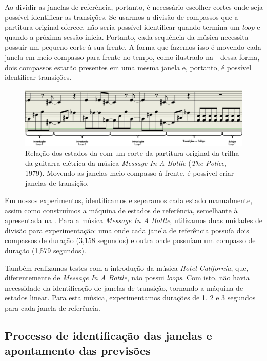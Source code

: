 Ao dividir as janelas de referência, portanto, é necessário escolher cortes onde seja possível identificar as transições. Se usarmos a divisão de compassos que a partitura original oferece, não seria possível identificar quando termina um \textit{loop} e quando a próxima sessão inicia. Portanto, cada sequência da música necessita possuir um pequeno corte à sua frente. A forma que fazemos isso é movendo cada janela em meio compasso para frente no tempo, como ilustrado na  - dessa forma, dois compassos estarão presentes em uma mesma janela e, portanto, é possível identificar transições.

\begin{figure}[htbp]
    \centering
    \includegraphics[width=1\textwidth]{images/dtw-window division.png}
    \caption{Relação dos estados da  com um corte da partitura original da trilha da guitarra elétrica da música \textit{Message In A Bottle} (\textit{The Police}, 1979). Movendo as janelas meio compasso à frente, é possível criar janelas de transição.}
    \label{fig:miab_windowed_sheet_music}
\end{figure}

Em nossos experimentos, identificamos e separamos cada estado manualmente, assim como construímos a máquina de estados de referência, semelhante à apresentada na . Para a música \textit{Message In A Bottle}, utilizamos duas unidades de divisão para experimentação: uma onde cada janela de referência possuía dois compassos de duração (3,158 segundos) e outra onde possuíam um compasso de duração (1,579 segundos).

Também realizamos testes com a introdução da música \textit{Hotel California}, que, diferentemente de \textit{Message In A Bottle}, não possui \textit{loops}. Com isto, não havia necessidade da identificação de janelas de transição, tornando a máquina de estados linear. Para esta música, experimentamos durações de 1, 2 e 3 segundos para cada janela de referência.

\subsection{Processo de identificação das janelas e apontamento das previsões}

